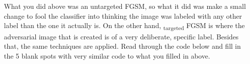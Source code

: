 \documentclass[11pt]{article}
\begin{document}
    \begin{center}
    \end{center}
    { \hspace*{\fill} \\}
    
    \begin{center}
    \end{center}
    { \hspace*{\fill} \\}
    
    What you did above was an untargeted FGSM, so what it did was make a
small change to fool the classifier into thinking the image was labeled
with any other label than the one it actually is. On the other hand,
\textsubscript{targeted} FGSM is where the adversarial image that is
created is of a very deliberate, specific label. Besides that, the same
techniques are applied. Read through the code below and fill in the 5
blank spots with very similar code to what you filled in above.
\end{document}
